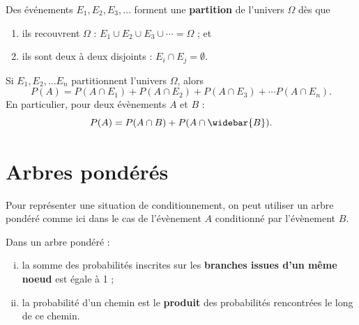 \documentclass[a4paper, 12pt]{report}
\begin{document}
\begin{defn}[Partition]
Des événements $E_1, E_2, E_3, \dots$ forment une \textbf{partition} de l'univers $\Omega$ dès que
	\begin{enumerate}
		\item ils recouvrent $\Omega$ : $E_1 \cup E_2 \cup E_3 \cup \cdots = \Omega$ ; et
		\item ils sont deux à deux disjoints : $E_i \cap E_j = \emptyset$.
	\end{enumerate}
\end{defn}

\begin{thm}
Si $E_1, E_2, \dots E_n$ partitionnent l'univers $\Omega$, alors
	\[ P(A) = P(A\cap E_1) + P(A\cap E_2 ) + P(A\cap E_3) + \cdots P(A \cap E_n). \]
En particulier, pour deux évènements $A$ et $B$ :
\[ P(A) = P(A \cap B) + P(A \cap \widebar{B}) . \]
\end{thm}

\section{Arbres pondérés}

\begin{defn}
Pour représenter une situation de conditionnement, on peut utiliser un arbre pondéré comme ici dans le cas de l'évènement $A$
conditionné par l'évènement $B$.

\begin{center}
\end{center}
\end{defn}

\begin{prop}
Dans un arbre pondéré  :
\begin{enumerate}[(i)]
\item la somme des probabilités inscrites sur les \textbf{branches issues d'un même noeud} est égale à 1 ;
\item la probabilité d'un chemin est le \textbf{produit} des probabilités rencontrées le long de ce chemin.
\end{enumerate}
\end{prop}
\end{document}
